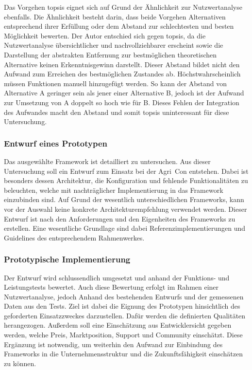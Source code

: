Das Vorgehen \Gls{topsis} eignet sich auf Grund der Ähnlichkeit zur Nutzwertanalyse ebenfalls.
Die Ähnlichkeit besteht darin, dass beide Vorgehen Alternativen entsprechend ihrer Erfüllung oder dem Abstand zur schlechtesten und besten Möglichkeit bewerten.
Der Autor entschied sich gegen \Gls{topsis}, da die Nutzwertanalyse übersichtlicher und nachvollziehbarer erscheint sowie die Darstellung der abstrakten Entfernung zur bestmöglichen theoretischen Alternative keinen Erkenntnisgewinn darstellt.
Dieser Abstand bildet nicht den Aufwand zum Erreichen des bestmöglichen Zustandes ab. Höchstwahrscheinlich müssen Funktionen manuell hinzugefügt werden. So kann der Abstand von Alternative A geringer sein als jener einer Alternative B, jedoch ist der Aufwand zur Umsetzung von A doppelt so hoch wie für B.
Dieses Fehlen der Integration des Aufwandes macht den Abstand und somit \Gls{topsis} uninteressant für diese Untersuchung.

\subsubsection{Entwurf eines Prototypen}
Das ausgewählte Framework ist detailliert zu untersuchen.
Aus dieser Untersuchung soll ein Entwurf zum Einsatz bei der Agri~Con entstehen.
Dabei ist besonders dessen Architektur, die Konfiguration und fehlende Funktionalitäten zu beleuchten, welche mit nachträglicher Implementierung in das Framework einzubinden sind.
Auf Grund der wesentlich unterschiedlichen Frameworks, kann vor der Auswahl keine konkrete Architekturempfehlung verwendet werden. Dieser Entwurf ist nach den Anforderungen und den Eigenheiten des Frameworks zu erstellen. Eine wesentliche Grundlage sind dabei Referenzimplementierungen und Guidelines des entsprechendem Rahmenwerkes.

\subsubsection{Prototypische Implementierung}
Der Entwurf wird schlussendlich umgesetzt und anhand der Funktions- und Leistungstests bewertet.
Auch diese Bewertung erfolgt im Rahmen einer Nutzwertanalyse, jedoch Anhand des bestehenden Entwurfs und der gemessenen Daten aus den Tests.
Ziel ist dabei die Eignung des Prototypen hinsichtlich des geforderten Einsatzzweckes darzustellen.
Dafür werden die definierten Qualitäten herangezogen.
Außerdem soll eine Einschätzung aus Entwicklersicht gegeben werden, welche Preis, Marktposition, Support und Community einschätzt.
Diese Ergänzung ist notwendig, um weiterhin den Aufwand zur Einbindung des Frameworks in die Unternehmensstruktur und die Zukunftsfähigkeit einschätzen zu können.

